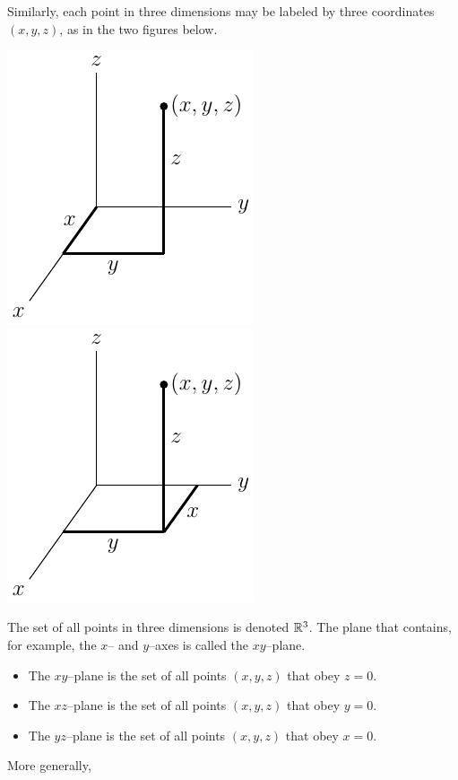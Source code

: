 Similarly, each point in three dimensions may be labeled by
three coordinates $(x,y,z)$, as in the two figures below.
\begin{efig}
\begin{center}
   \includegraphics{point3d}\qquad
   \includegraphics{point3db}
\end{center}
\end{efig}
The set of all points in three dimensions is denoted $\mathbb{R}^3$.
The plane that contains, for example, the $x$-- and $y$--axes
is called the $xy$--plane.
\begin{itemize}\itemsep1pt \parskip0pt 
\item The $xy$--plane is the set of all points $(x,y,z)$ that
obey $z=0$.
\item The $xz$--plane is the set of all points $(x,y,z)$ that
obey $y=0$.
\item The $yz$--plane is the set of all points $(x,y,z)$ that
obey $x=0$.
\end{itemize}
More generally,
